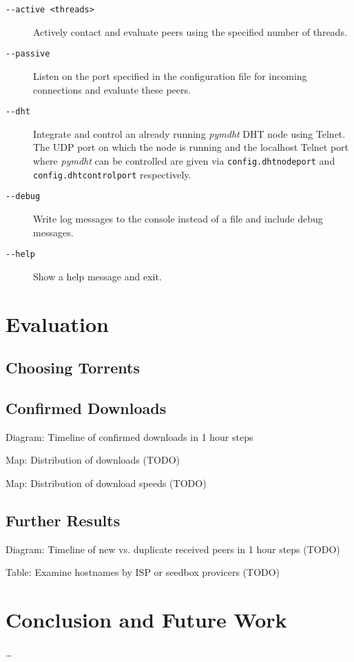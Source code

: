 \documentclass[10pt, a4paper]{scrartcl} %
\renewcommand{\_}{\origunderscore\allowbreak}
\newcommand{\config}[1]{\texttt{config.\allowbreak #1}}
\begin{document}
\begin{description}
  \item[\texttt{-{}-active <threads>}] Actively contact and evaluate peers using the specified number of threads.
  \item[\texttt{-{}-passive}] Listen on the port specified in the configuration file for incoming connections and evaluate these peers.
  \item[\texttt{-{}-dht}] Integrate and control an already running \emph{pymdht} \cite{pymdht} DHT node using Telnet. The UDP port on which the node is running and the localhost Telnet port where \emph{pymdht} can be controlled are given via \config{dht\_node\_port} and \config{dht\_control\_port} respectively.
  \item[\texttt{-{}-debug}] Write log messages to the console instead of a file and include debug messages.
  \item[\texttt{-{}-help}] Show a help message and exit.
\end{description}

\section{Evaluation}
\subsection{Choosing Torrents}

\subsection{Confirmed Downloads}
Diagram: Timeline of confirmed downloads in 1 hour steps

Map: Distribution of downloads (TODO)

Map: Distribution of download speeds (TODO)

\subsection{Further Results}
Diagram: Timeline of new vs. duplicate received peers in 1 hour steps (TODO)

Table: Examine hostnames by ISP or seedbox provicers (TODO)

\section{Conclusion and Future Work}
\dots

\newpage

\printbibliography[heading=bibintoc]
\end{document}
